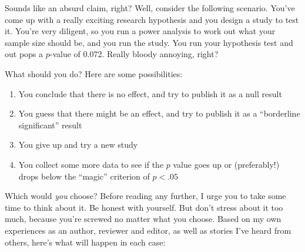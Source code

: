 Sounds like an absurd claim, right? Well, consider the following scenario. You've come up with a really exciting research hypothesis and you design a study to test it. You're very diligent, so you run a power analysis to work out what your sample size should be, and you run the study. You run your hypothesis test and out pops a $p$-value of 0.072. Really bloody annoying, right? 

What should you do? Here are some possibilities:

\begin{enumerate} \itemsep -2pt
\item You conclude that there is no effect, and try to publish it as a null result
\item You guess that there might be an effect, and try to publish it as a ``borderline significant'' result
\item You give up and try a new study
\item You collect some more data to see if the $p$ value goes up or (preferably!) drops below the ``magic'' criterion of $p<.05$
\end{enumerate}

\noindent
Which would {\it you} choose? Before reading any further, I urge you to take some time to think about it. Be honest with yourself. But don't stress about it too much, because you're screwed no matter what you choose. Based on my own experiences as an author, reviewer and editor, as well as stories I've heard from others, here's what will happen in each case:


